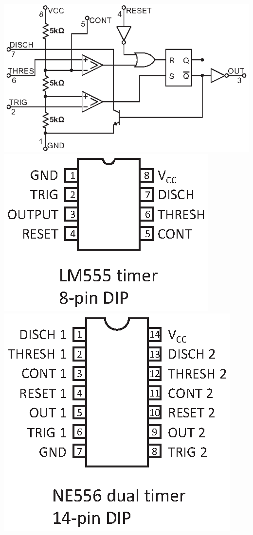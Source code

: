 \includegraphics[scale=0.96]{timers/555_block_diagram_multisim.eps}
\hspace{-0.7in}
\hfill
\includegraphics[scale=0.72]{timers/lm555_simple_2line.eps}
\hspace{-0.2in}\includegraphics[scale=0.72]{timers/ne556_abrev_2line.eps}
\hspace{-0.1in}

